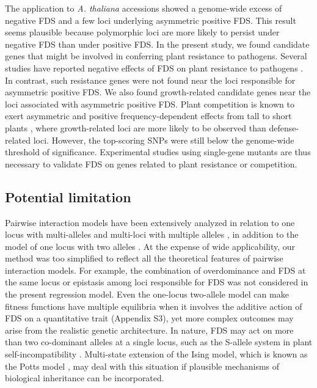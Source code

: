 \documentclass[12pt,]{article}
\begin{document}
The application to \textit{A. thaliana} accessions showed a genome-wide excess of negative FDS and a few loci underlying asymmetric positive FDS. This result seems plausible because polymorphic loci are more likely to persist under negative FDS than under positive FDS. In the present study, we found candidate genes that might be involved in conferring plant resistance to pathogens. Several studies have reported negative effects of FDS on plant resistance to pathogens \citep{antonovics1984experimental, brunet2000disease}. In contrast, such resistance genes were not found near the loci responsible for asymmetric positive FDS. We also found growth-related candidate genes near the loci associated with asymmetric positive FDS. Plant competition is known to exert asymmetric and positive frequency-dependent effects from tall to short plants \citep{weiner1990asymmetric}, where growth-related loci are more likely to be observed than defense-related loci. However, the top-scoring SNPs were still below the genome-wide threshold of significance. Experimental studies using single-gene mutants are thus necessary to validate FDS on genes related to plant resistance or competition.

\subsection{Potential limitation}
Pairwise interaction models have been extensively analyzed in relation to one locus with multi-alleles \citep{schneider2006multilocus, trotter2007frequency} and multi-loci with multiple alleles \citep{schneider2010maximization}, in addition to the model of one locus with two alleles \citep{cockerham1972frequency, asmussen_frequency-dependent_1990, schneider_maximization_2008}. At the expense of wide applicability, our method was too simplified to reflect all the theoretical features of pairwise interaction models. For example, the combination of overdominance and FDS at the same locus or epistasis among loci responsible for FDS was not considered in the present regression model. Even the one-locus two-allele model can make fitness functions have multiple equilibria when it involves the additive action of FDS on a quantitative trait (Appendix S3), yet more complex outcomes may arise from the realistic genetic architecture. In nature, FDS may act on more than two co-dominant alleles at a single locus, such as the S-allele system in plant self-incompatibility \citep{hatakeyama1998dominance, shimizu2015evolution}. Multi-state extension of the Ising model, which is known as the Potts model \citep{potts_1952}, may deal with this situation if plausible mechanisms of biological inheritance can be incorporated. 
\end{document}
